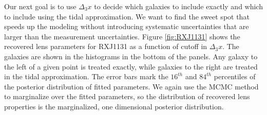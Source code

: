 Our next goal is to use $\Delta_3x$ to decide which galaxies to include exactly and which to include using the tidal approximation. We want to find the sweet spot that speeds up the modeling without introducing systematic uncertainties that are larger than the measurement uncertainties.
Figure \ref{fig:RXJ1131} shows the recovered lens parameters for RXJ1131 as a function of cutoff in $\Delta_3x$. The galaxies are shown in the histograms in the bottom of the panels. Any galaxy to the left of a given point is treated exactly, while galaxies to the right are treated in the tidal approximation. The error bars mark the $16^{th}$ and $84^{th}$ percentiles of the posterior distribution of fitted parameters. We again use the MCMC method to marginalize over the fitted parameters, so the distribution of recovered lens properties is the marginalized, one dimensional posterior distribution.
  